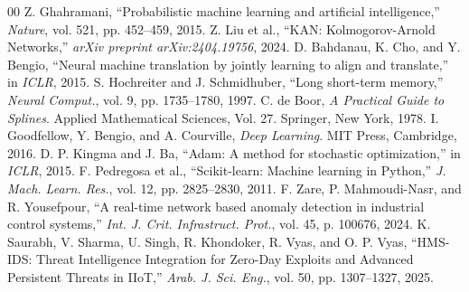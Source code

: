 \documentclass[twocolumn]{article}
\begin{document}
\begin{thebibliography}{00}
 Z. Ghahramani, ``Probabilistic machine learning and artificial intelligence,'' \textit{Nature}, vol. 521, pp. 452--459, 2015.
 Z. Liu et al., ``KAN: Kolmogorov-Arnold Networks,'' \textit{arXiv preprint arXiv:2404.19756}, 2024.
 D. Bahdanau, K. Cho, and Y. Bengio, ``Neural machine translation by jointly learning to align and translate,'' in \textit{ICLR}, 2015.
 S. Hochreiter and J. Schmidhuber, ``Long short-term memory,'' \textit{Neural Comput.}, vol. 9, pp. 1735--1780, 1997.
 C. de Boor, \textit{A Practical Guide to Splines}. Applied Mathematical Sciences, Vol. 27. Springer, New York, 1978.
 I. Goodfellow, Y. Bengio, and A. Courville, \textit{Deep Learning}. MIT Press, Cambridge, 2016.
 D. P. Kingma and J. Ba, ``Adam: A method for stochastic optimization,'' in \textit{ICLR}, 2015.
 F. Pedregosa et al., ``Scikit-learn: Machine learning in Python,'' \textit{J. Mach. Learn. Res.}, vol. 12, pp. 2825--2830, 2011.
 F. Zare, P. Mahmoudi-Nasr, and R. Yousefpour, ``A real-time network based anomaly detection in industrial control systems,'' \textit{Int. J. Crit. Infrastruct. Prot.}, vol. 45, p. 100676, 2024.
 K. Saurabh, V. Sharma, U. Singh, R. Khondoker, R. Vyas, and O. P. Vyas, ``HMS-IDS: Threat Intelligence Integration for Zero-Day Exploits and Advanced Persistent Threats in IIoT,'' \textit{Arab. J. Sci. Eng.}, vol. 50, pp. 1307--1327, 2025.
\end{thebibliography}
\end{document}
